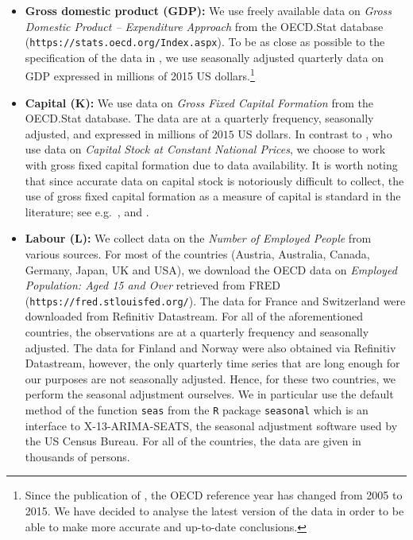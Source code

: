 \documentclass[12pt]{article}
\begin{document}
\begin{itemize}[leftmargin=0.5cm, itemsep=0pt, parsep=0pt, topsep=3pt]
\item \textbf{Gross domestic product ($\boldsymbol{GDP}$):} We use freely available data on \textit{Gross Domestic Product -- Expenditure Approach} from the OECD.Stat %
database (\texttt{https://stats.\linebreak oecd.org/Index.aspx}). To be as close as possible to the specification of the data in \cite{Zhang2012}, we use seasonally adjusted quarterly data on GDP expressed in millions of 2015 US dollars.\footnote{Since the publication of \cite{Zhang2012}, the OECD reference year has changed from 2005 to 2015. We have decided to analyse the latest version of the data in order to be able to make more accurate and up-to-date conclusions.} 

\enlargethispage{0.5cm}

\item \textbf{Capital ($\boldsymbol{K}$):} We use data on \textit{Gross Fixed Capital Formation} from the OECD.Stat %
database. The data are at a quarterly frequency, seasonally adjusted, and expressed in millions of $2015$ US dollars. In contrast to \cite{Zhang2012}, who use data on \textit{Capital Stock at Constant National Prices}, we choose to work with gross fixed capital formation due to data availability. It is worth noting that since accurate data on capital stock is notoriously difficult to collect, the use of gross fixed capital formation as a measure of capital is standard in the literature; see e.g.\ \cite{Sharma1994}, \cite{Lee2002} and \cite{Lee2005}.

\item \textbf{Labour ($\boldsymbol{L}$):} We collect data on the \textit{Number of Employed People} from various sources. For most of the countries (Austria, Australia, Canada, Germany, Japan, UK and USA), we download the OECD data on \textit{Employed Population: Aged 15 and Over} retrieved from FRED (\texttt{https://fred.stlouisfed.org/}). %
The data for France and Switzerland were downloaded from Refinitiv Datastream. For all of the aforementioned countries, the observations are at a quarterly frequency and seasonally adjusted. The data for Finland and Norway were also obtained via Refinitiv Datastream, however, the only quarterly time series that are long enough for our purposes are not seasonally adjusted. Hence, for these two countries, we perform the seasonal adjustment ourselves. We in particular use the default method of the function \verb|seas| from the \verb|R| package \verb|seasonal| \citep*{Sax2018} which is an interface to X-13-ARIMA-SEATS, the seasonal adjustment software used by the US Census Bureau. 
For all of the countries, the data are given in thousands of persons.


\end{itemize}
\end{document}

